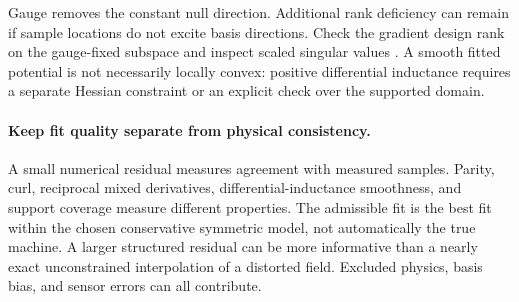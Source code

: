 Gauge removes the constant null direction. Additional rank deficiency can
remain if sample locations do not excite basis directions. Check the gradient
design rank on the gauge-fixed subspace and inspect scaled singular values
\cite{horn2013}. A smooth fitted potential is not necessarily locally convex:
positive differential inductance requires a separate Hessian constraint or
an explicit check over the supported domain.

\paragraph{Keep fit quality separate from physical consistency.}
A small numerical residual measures agreement with measured samples. Parity,
curl, reciprocal mixed derivatives, differential-inductance smoothness, and
support coverage measure different properties. The admissible fit is the
best fit within the chosen conservative symmetric model, not automatically
the true machine. A larger structured residual can be more informative than
a nearly exact unconstrained interpolation of a distorted field. Excluded
physics, basis bias, and sensor errors can all contribute.
